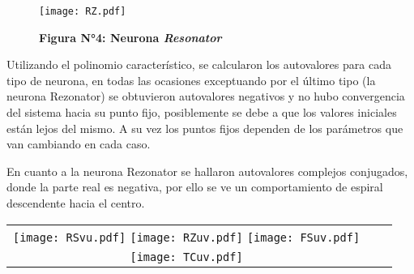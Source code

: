 \documentclass[12pt,a4paper]{article}
\begin{document}
\begin{figure}[h]
\caption*{\textbf{Figura N°4: Neurona \textit{Resonator}}}
\centering
\texttt{[image: RZ.pdf]}
\end{figure}

Utilizando el polinomio característico, se calcularon los autovalores para cada tipo de neurona, en todas las ocasiones exceptuando por el último tipo (la neurona Rezonator) se obtuvieron autovalores negativos y no hubo convergencia del sistema hacia su punto fijo, posiblemente se debe a que los valores iniciales están lejos del mismo. A su vez los puntos fijos dependen de los parámetros que van cambiando en cada caso.

En cuanto a la neurona Rezonator se hallaron autovalores complejos conjugados, donde la parte real es negativa, por ello se ve un comportamiento de espiral descendente hacia el centro. 

\begin{tabular}{ccc}
\texttt{[image: RSvu.pdf]} 
\texttt{[image: RZuv.pdf]} 
\texttt{[image: FSuv.pdf]} \\
\texttt{[image: TCuv.pdf]}
\end{tabular}
\end{document}

